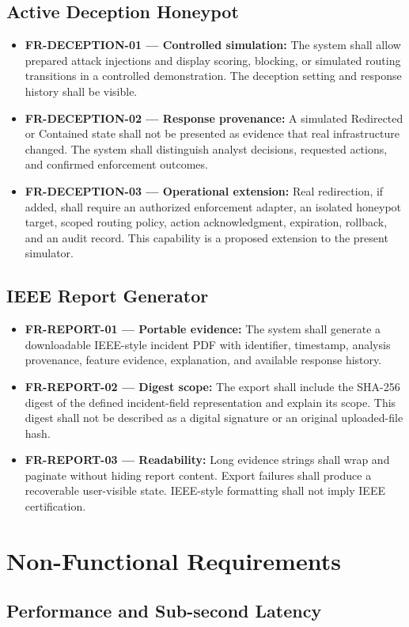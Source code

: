 \documentclass[12pt,a4paper,oneside]{report}
\newcommand{\req}[2]{\item \textbf{#1:} #2}
\begin{document}
\subsection{Active Deception Honeypot}
\begin{itemize}
\req{FR-DECEPTION-01 --- Controlled simulation}{The system shall allow prepared attack injections and display scoring, blocking, or simulated routing transitions in a controlled demonstration. The deception setting and response history shall be visible.}
\req{FR-DECEPTION-02 --- Response provenance}{A simulated Redirected or Contained state shall not be presented as evidence that real infrastructure changed. The system shall distinguish analyst decisions, requested actions, and confirmed enforcement outcomes.}
\req{FR-DECEPTION-03 --- Operational extension}{Real redirection, if added, shall require an authorized enforcement adapter, an isolated honeypot target, scoped routing policy, action acknowledgment, expiration, rollback, and an audit record. This capability is a proposed extension to the present simulator.}
\end{itemize}

\subsection{IEEE Report Generator}
\begin{itemize}
\req{FR-REPORT-01 --- Portable evidence}{The system shall generate a downloadable IEEE-style incident PDF with identifier, timestamp, analysis provenance, feature evidence, explanation, and available response history.}
\req{FR-REPORT-02 --- Digest scope}{The export shall include the SHA-256 digest of the defined incident-field representation and explain its scope. This digest shall not be described as a digital signature or an original uploaded-file hash.}
\req{FR-REPORT-03 --- Readability}{Long evidence strings shall wrap and paginate without hiding report content. Export failures shall produce a recoverable user-visible state. IEEE-style formatting shall not imply IEEE certification.}
\end{itemize}

\section{Non-Functional Requirements}

\subsection{Performance and Sub-second Latency}
\end{document}
